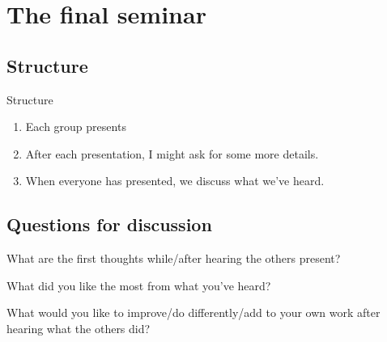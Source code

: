\section{The final seminar}

\subsection{Structure}

\begin{frame}
  \begin{block}{Structure}
    \begin{enumerate}
      \item Each group presents
      \item After each presentation, I might ask for some more details.
      \item When everyone has presented, we discuss what we've heard.
    \end{enumerate}
  \end{block}
\end{frame}

\subsection{Questions for discussion}

\begin{frame}
  \begin{question}
    What are the first thoughts while/after hearing the others present?
  \end{question}
  \begin{question}
    What did you like the most from what you've heard?
  \end{question}
  \begin{question}
    What would you like to improve/do differently/add to your own work 
    after hearing what the others did?
  \end{question}
\end{frame}
